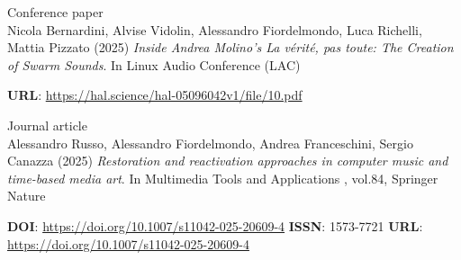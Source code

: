 \documentclass[7pt,a4paper]{article}
\begin{document}
\begin{mdframed}[
    backgroundcolor=entrygray,
    linecolor=entrygray,
    linewidth=0pt,
    innerleftmargin=6pt,
    innerrightmargin=6pt,
    innertopmargin=6pt,
    innerbottommargin=6pt,
    skipabove=0pt,
    skipbelow=0pt
]

\scriptsize Conference paper\\
\normalsize Nicola Bernardini, Alvise Vidolin, Alessandro Fiordelmondo, Luca Richelli, Mattia Pizzato
(2025) \textit{Inside Andrea Molino's La vérité, pas toute: The Creation of Swarm Sounds}.
In
Linux Audio Conference (LAC)

\vspace{0.1cm}
\scriptsize 
\scriptsize 
\scriptsize 
\scriptsize  \textbf{URL}: \href{https://hal.science/hal-05096042v1/file/10.pdf}{https://hal.science/hal-05096042v1/file/10.pdf}
\vspace{0.15cm}
\end{mdframed}




\begin{mdframed}[
    backgroundcolor=white,
    linecolor=white,
    linewidth=0pt,
    innerleftmargin=6pt,
    innerrightmargin=6pt,
    innertopmargin=6pt,
    innerbottommargin=6pt,
    skipabove=0pt,
    skipbelow=0pt
]

\scriptsize Journal article\\
\normalsize Alessandro Russo, Alessandro Fiordelmondo, Andrea Franceschini, Sergio Canazza
(2025) \textit{Restoration and reactivation approaches in computer music and time-based media art}.
In
 Multimedia Tools and Applications
, vol.84, Springer Nature

\vspace{0.1cm}
\scriptsize  \textbf{DOI}: \href{https://doi.org/10.1007/s11042-025-20609-4}{https://doi.org/10.1007/s11042-025-20609-4}
\scriptsize 
\scriptsize  \textbf{ISSN}: 1573-7721 
\scriptsize  \textbf{URL}: \href{https://doi.org/10.1007/s11042-025-20609-4}{https://doi.org/10.1007/s11042-025-20609-4}
\vspace{0.15cm}
\end{mdframed}
\end{document}
